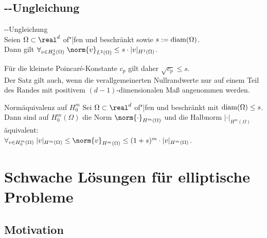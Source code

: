 \subsection{%
    --Ungleichung%
}

\begin{Satz}{--Ungleichung}\\
    Seien $\Omega \subset \real^d$ of"|fen und beschränkt sowie $s := \operatorname{diam}(\Omega)$.\\
    Dann gilt $\forall_{v \in H^1_0(\Omega)}\;
    \norm{v}_{L^2(\Omega)} \le s \cdot |v|_{H^1(\Omega)}$.
\end{Satz}

\begin{Bem}
    Für die kleinste Poincaré-Konstante $c_p$ gilt daher $\sqrt{c_p} \le s$.\\
    Der Satz gilt auch, wenn die verallgemeinerten Nullrandwerte nur auf einem Teil des
    Randes mit positivem $(d-1)$-dimensionalen Maß angenommen werden.
\end{Bem}

\begin{Satz}{Normäquivalenz auf $H^m_0$}
    Sei $\Omega \subset \real^d$ of"|fen und beschränkt mit $\operatorname{diam}(\Omega) \le s$.\\
    Dann sind auf $H_0^m(\Omega)$ die Norm $\norm{\cdot}_{H^m(\Omega)}$ und die Halbnorm
    $|\cdot|_{H^m(\Omega)}$ äquivalent:\\
    $\forall_{v \in H^m_0(\Omega)}\;
    |v|_{H^m(\Omega)} \le \norm{v}_{H^m(\Omega)} \le (1 + s)^m \cdot |v|_{H^m(\Omega)}$.
\end{Satz}

\pagebreak

\section{%
    Schwache Lösungen für elliptische Probleme%
}

\subsection{%
    Motivation%
}

